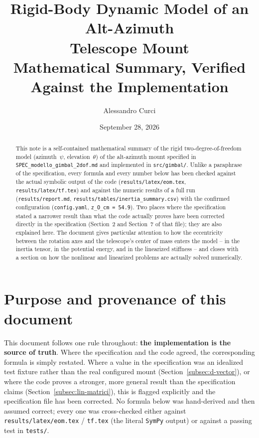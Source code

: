 \documentclass[11pt,a4paper]{article}
\title{Rigid-Body Dynamic Model of an Alt-Azimuth\\ Telescope Mount\\[4pt]
\large Mathematical Summary, Verified Against the Implementation}
\author{Alessandro Curci}
\date{September 28, 2026}
\numberwithin{equation}{section}
\begin{document}
\maketitle

\begin{abstract}
\noindent This note is a self-contained mathematical summary of the rigid two-degree-of-freedom model (azimuth~$\psi$, elevation~$\theta$) of the alt-azimuth mount specified in \texttt{SPEC\_\allowbreak modello\_\allowbreak gimbal\_\allowbreak 2dof.md} and implemented in \texttt{src/gimbal/}. Unlike a paraphrase of the specification, every formula and every number below has been checked against the actual symbolic output of the code (\texttt{results/latex/eom.tex}, \texttt{results/latex/tf.tex}) and against the numeric results of a full run (\texttt{results/report.md}, \texttt{results/tables/inertia\_summary.csv}) with the confirmed configuration (\texttt{config.yaml}, \texttt{z\_O\_cm = 54.9}). Two places where the specification stated a narrower result than what the code actually proves have been corrected directly in the specification (Section~2 and Section~7 of that file); they are also explained here. The document gives particular attention to how the eccentricity between the rotation axes and the telescope's center of mass enters the model -- in the inertia tensor, in the potential energy, and in the linearized stiffness -- and closes with a section on how the nonlinear and linearized problems are actually solved numerically.
\end{abstract}

\tableofcontents
\newpage

\section{Purpose and provenance of this document}
\label{sec:intro}

This document follows one rule throughout: \textbf{the implementation is the source of truth}. Where the specification and the code agreed, the corresponding formula is simply restated. Where a value in the specification was an idealized test fixture rather than the real configured mount (Section~\ref{subsec:d-vector}), or where the code proves a stronger, more general result than the specification claims (Section~\ref{subsec:lin-matrici}), this is flagged explicitly and the specification file has been corrected. No formula below was hand-derived and then assumed correct; every one was cross-checked either against \texttt{results/latex/eom.tex} / \texttt{tf.tex} (the literal \texttt{SymPy} output) or against a passing test in \texttt{tests/}.
\end{document}
